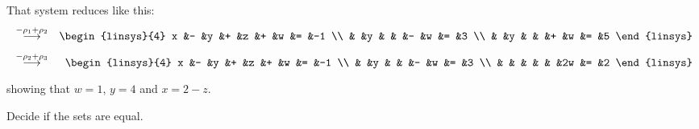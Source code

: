 \begin{exercises}
\begin{equation*}
    \end{equation*}
    \begin{answer}
      That system reduces like this:
      \begin{eqnarray*}
         &\grstep{-\rho_1+\rho_2}
         &\begin{linsys}{4}
           x  &-  &y  &+  &z  &+  &w  &=  &-1  \\
              &   &y  &   &   &-  &w  &=  &3   \\
              &   &y  &   &   &+  &w  &=  &5   
           \end{linsys}                              \\
         &\grstep{-\rho_2+\rho_3}
         &\begin{linsys}{4}
           x  &-  &y  &+  &z  &+  &w  &=  &-1  \\
              &   &y  &   &   &-  &w  &=  &3   \\
              &   &   &   &   &   &2w &=  &2   
          \end{linsys}
      \end{eqnarray*}
      showing that \( w=1 \), \( y=4 \) and \( x=2-z \).   
    \end{answer}
  \recommended \item 
    Decide if the sets are equal.
\end{exercises}
